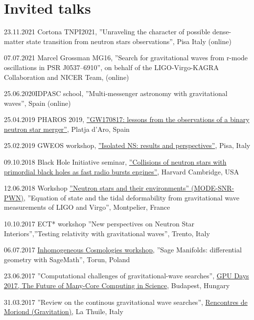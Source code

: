 \documentclass[]{friggeri-cv} %
\begin{document}
%  
\section{Invited talks}
\begin{entrylistoc}

\entrys 
{23.11.2021}
{Cortona TNPI2021, ''Unraveling the character of possible dense-matter state transition from neutron stars observations'', Pisa Italy (online)}

\entrys
{07.07.2021}{
Marcel Grossman MG16, ''Search for gravitational waves from r-mode oscillations in PSR J0537--6910'', on behalf of the LIGO-Virgo-KAGRA Collaboration and NICER Team, (online)}

\entrys
{25.06.2020}{IDPASC school, ''Multi-messenger astronomy with gravitational waves'', Spain (online)}

\entrys 
{25.04.2019} 
{{PHAROS 2019}, \href{https://indico.ice.csic.es/event/12/page/12-final-program}{''GW170817: lessons from the observations of a binary neutron star merger''}, {Platja d'Aro, Spain}}  

\entrys 
{25.02.2019} 
{{GWEOS workshop}, \href{https://agenda.infn.it/event/17643/timetable/\#20190225}{''Isolated NS: results and perspectives''}, {Pisa, Italy}} 

\entrys 
{09.10.2018} 
{{Black Hole Initiative seminar}, \href{https://arxiv.org/abs/1704.05931}{''Collisions of neutron stars with primordial black holes as fast radio bursts engines''}, {Harvard Cambridge, USA}} 

\entrys
{12.06.2018}
{{Workshop \href{https://mode2018.sciencesconf.org/program}{''Neutron stars and their environments'' (MODE-SNR-PWN)}}, {''Equation of state and the tidal deformability from gravitational wave measurements of LIGO and Virgo'', Montpelier, France}}

\entrys 
{10.10.2017} 
{{ECT* workshop ''New perspectives on Neutron Star Interiors''},{''Testing relativity with gravitational waves'', Trento, Italy}} 

\entrys
{06.07.2017} 
{\href{https://cosmo.torun.pl/cosmotorun17.html}{Inhomogeneous Cosmologies workshop}, ''Sage Manifolds: differential geometry with SageMath'', Torun, Poland} 

\entrys 
{23.06.2017}
{''Computational challenges of gravitational-wave searches'', \href{http://gpuday.com}{GPU Days 2017, The Future of Many-Core Computing in Science}, Budapest, Hungary} 

\entrys 
{31.03.2017}
{''Review on the continous gravitational wave searches'', \href{http://moriond.in2p3.fr/grav/2017/program.php\#Friday}{Rencontres de Moriond (Gravitation)}, La Thuile, Italy}


\end{entrylistoc}
\end{document}
